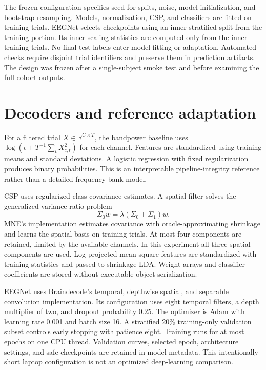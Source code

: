 \documentclass[11pt]{article}
\begin{document}
The frozen configuration specifies seed \SeedValue{} for splits, noise, model initialization, and bootstrap resampling. Models, normalization, CSP, and classifiers are fitted on training trials. EEGNet selects checkpoints using an inner stratified split from the training portion. Its inner scaling statistics are computed only from the inner training trials. No final test labels enter model fitting or adaptation. Automated checks require disjoint trial identifiers and preserve them in prediction artifacts. The design was frozen after a single-subject smoke test and before examining the full cohort outputs.

\section{Decoders and reference adaptation}
For a filtered trial $X\in\mathbb{R}^{C\times T}$, the bandpower baseline uses $\log(\epsilon+T^{-1}\sum_t X_{c,t}^2)$ for each channel. Features are standardized using training means and standard deviations. A logistic regression with fixed regularization produces binary probabilities. This is an interpretable pipeline-integrity reference rather than a detailed frequency-bank model.

CSP uses regularized class covariance estimates. A spatial filter solves the generalized variance-ratio problem
\begin{equation}
\Sigma_0 w = \lambda(\Sigma_0+\Sigma_1)w.
\end{equation}
MNE's implementation estimates covariance with oracle-approximating shrinkage and learns the spatial basis on training trials. At most four components are retained, limited by the available channels. In this experiment all three spatial components are used. Log projected mean-square features are standardized with training statistics and passed to shrinkage LDA. Weight arrays and classifier coefficients are stored without executable object serialization.

EEGNet uses Braindecode's temporal, depthwise spatial, and separable convolution implementation. Its configuration uses eight temporal filters, a depth multiplier of two, and dropout probability 0.25. The optimizer is Adam with learning rate 0.001 and batch size 16. A stratified 20\% training-only validation subset controls early stopping with patience eight. Training runs for at most \MaxEpochs{} epochs on one CPU thread. Validation curves, selected epoch, architecture settings, and safe checkpoints are retained in model metadata. This intentionally short laptop configuration is not an optimized deep-learning comparison.
\end{document}
